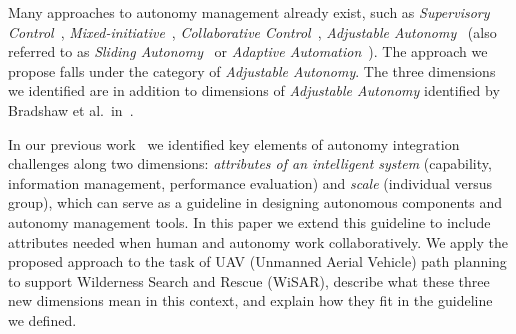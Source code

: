 \documentclass[journal]{IEEEtran}
\begin{document}
Many approaches to autonomy management already exist, such as \textit{Supervisory Control}~\cite{Sheridan1992Telerobotics}, \textit{Mixed-initiative}~\cite{Hearst1999Mixed}, \textit{Collaborative Control}~\cite{Fong1999Collaborative}, \textit{Adjustable Autonomy}~\cite{Dorais1998AdjustableAutonomy,Dorais2001Designing} (also referred to as \textit{Sliding Autonomy}~\cite{Dias2008SlidingAutonomy} or \textit{Adaptive Automation}~\cite{Rouse1988Adaptive,Kaber2001Design}). The approach we propose falls under the category of \textit{Adjustable Autonomy}. The three dimensions we identified are in addition to dimensions of \textit{Adjustable Autonomy} identified by Bradshaw et al.\ in~\cite{Bradshaw2004Dimensions}.

In our previous work~\cite{Lin2010Supporting} we identified key elements of autonomy integration challenges along two dimensions: \textit{attributes of an intelligent system} (capability, information management, performance evaluation) and \textit{scale} (individual versus group), which can serve as a guideline in designing autonomous components and autonomy management tools. In this paper we extend this guideline to include attributes needed when human and autonomy work collaboratively. We apply the proposed approach to the task of UAV (Unmanned Aerial Vehicle) path planning to support Wilderness Search and Rescue (WiSAR), describe what these three new dimensions mean in this context, and explain how they fit in the guideline we defined.
\end{document}
